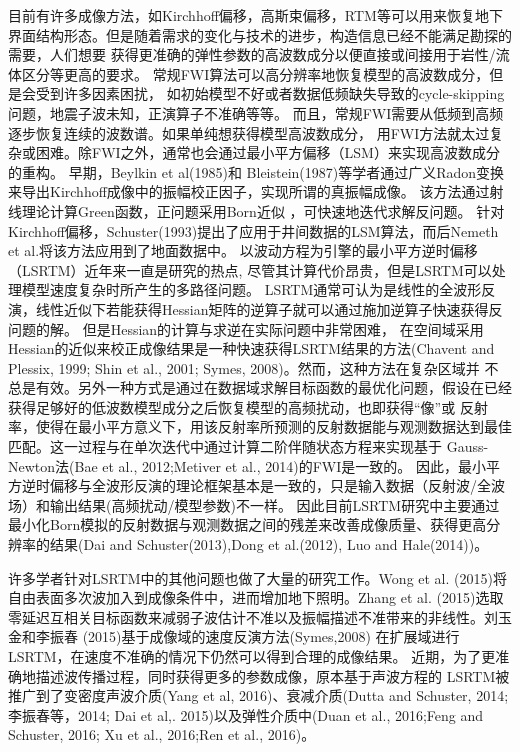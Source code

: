 目前有许多成像方法，如Kirchhoff偏移，高斯束偏移，RTM等可以用来恢复地下界面结构形态。但是随着需求的变化与技术的进步，构造信息已经不能满足勘探的需要，人们想要
获得更准确的弹性参数的高波数成分以便直接或间接用于岩性/流体区分等更高的要求。
常规FWI算法可以高分辨率地恢复模型的高波数成分，但是会受到许多因素困扰，
如初始模型不好或者数据低频缺失导致的cycle-skipping问题，地震子波未知，正演算子不准确等等。
而且，常规FWI需要从低频到高频逐步恢复连续的波数谱。如果单纯想获得模型高波数成分，
用FWI方法就太过复杂或困难。除FWI之外，通常也会通过最小平方偏移（LSM）来实现高波数成分的重构。
早期，Beylkin
et al(1985)\cite{BeylkinEtAl1985}和
Bleistein(1987)\cite{Bleistein1987}等学者通过广义Radon变换来导出Kirchhoff成像中的振幅校正因子，实现所谓的真振幅成像。
该方法通过射线理论计算Green函数，正问题采用Born近似
，可快速地迭代求解反问题。
针对Kirchhoff偏移，Schuster(1993)\cite{Schuster1993}提出了应用于井间数据的LSM算法，而后Nemeth et al.\cite{Nemeth1999}将该方法应用到了地面数据中。
以波动方程为引擎的最小平方逆时偏移（LSRTM）近年来一直是研究的热点,
尽管其计算代价昂贵，但是LSRTM可以处理模型速度复杂时所产生的多路径问题。
LSRTM通常可认为是线性的全波形反演，线性近似下若能获得Hessian矩阵的逆算子就可以通过施加逆算子快速获得反问题的解。
但是Hessian的计算与求逆在实际问题中非常困难，
在空间域采用Hessian的近似来校正成像结果是一种快速获得LSRTM结果的方法(Chavent and Plessix, 
1999\cite{ChaventEtAl1999}; Shin et al., 2001\cite{shin2001improved}; Symes,
2008\cite{Symes2008})。然而，这种方法在复杂区域并
不总是有效。另外一种方式是通过在数据域求解目标函数的最优化问题，假设在已经获得足够好的低波数模型成分之后恢复模型的高频扰动，也即获得“像”或
反射率，使得在最小平方意义下，用该反射率所预测的反射数据能与观测数据达到最佳匹配。这一过程与在单次迭代中通过计算二阶伴随状态方程来实现基于
Gauss-Newton法(Bae et al., 2012\cite{bae2012frequency};Metiver et al.,
2014\cite{Metivier2014})的FWI是一致的。
因此，最小平方逆时偏移与全波形反演的理论框架基本是一致的，只是输入数据（反射波/全波场）和输出结果(高频扰动/模型参数)不一样。
因此目前LSRTM研究中主要通过最小化Born模拟的反射数据与观测数据之间的残差来改善成像质量、获得更高分辨率的结果(Dai and
Schuster(2013)\cite{Dai2013},Dong et al.(2012)\cite{Dong2012}, Luo and
Hale(2014)\cite{Luo2014})。

许多学者针对LSRTM中的其他问题也做了大量的研究工作。Wong et al.
(2015)\cite{WongEtAl2015}将自由表面多次波加入到成像条件中，进而增加地下照明。Zhang et al.
(2015)\cite{ZhangEtAl2015}选取零延迟互相关目标函数来减弱子波估计不准以及振幅描述不准带来的非线性。刘玉金和李振春
(2015)\cite{刘玉金2015}基于成像域的速度反演方法(Symes,2008\cite{Symes2008a})
在扩展域进行LSRTM，在速度不准确的情况下仍然可以得到合理的成像结果。
近期，为了更准确地描述波传播过程，同时获得更多的参数成像，原本基于声波方程的
LSRTM被推广到了变密度声波介质(Yang et al, 2016)\cite{Yang2016}、衰减介质(Dutta and
Schuster, 2014\cite{DuttaEtAl2014}; 李振春等，2014\cite{李振春2014}; Dai et al,.
2015\cite{Dai2015})以及弹性介质中(Duan et al., 2016\cite{Duan2016};Feng and Schuster,
2016\cite{Feng2016}; Xu et al., 2016\cite{Xu2016};Ren et al., 2016\cite{RenEtAl2016})。


